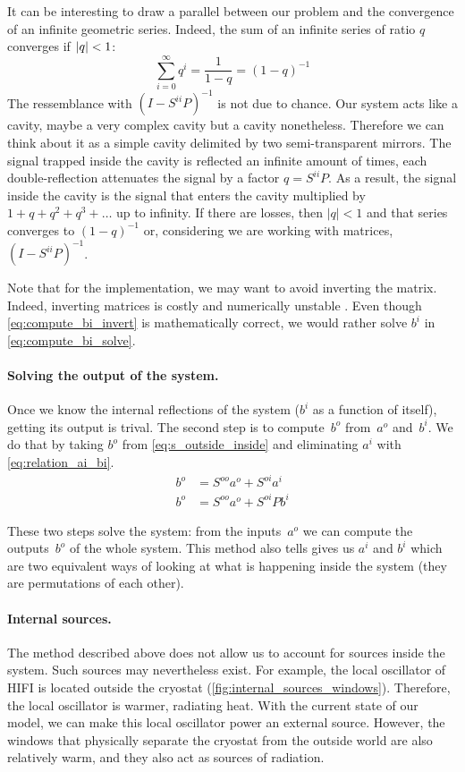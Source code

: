 It can be interesting to draw a parallel between our problem and the convergence of an infinite geometric series.
Indeed, the sum of an infinite series of ratio $q$ converges if $\left| q \right| < 1$:
\begin{equation}
    \sum_{i=0}^\infty q^i = \frac{1}{1-q} = (1-q)^{-1}
\end{equation}
The ressemblance with $(I - S^{ii}P)^{-1}$ is not due to chance.
Our system acts like a cavity, maybe a very complex cavity but a cavity nonetheless.
Therefore we can think about it as a simple cavity delimited by two semi-transparent mirrors.
The signal trapped inside the cavity is reflected an infinite amount of times, each double-reflection attenuates the signal by a factor $q=S^{ii}P$.
As a result, the signal inside the cavity is the signal that enters the cavity multiplied by $1+q+q^2+q^3+\dots$ up to infinity.
If there are losses, then $|q|<1$ and that series converges to $(1-q)^{-1}$ or, considering we are working with matrices, $(I - S^{ii}P)^{-1}$.

Note that for the implementation, we may want to avoid inverting the matrix.
Indeed, inverting matrices is costly and numerically unstable .
Even though \cref{eq:compute_bi_invert} is mathematically correct, we would rather solve $b^i$ in \cref{eq:compute_bi_solve}.

\paragraph{Solving the output of the system.}
Once we know the internal reflections of the system ($b^i$ as a function of itself), getting its output is trival.
The second step is to compute~$b^o$ from~$a^o$ and~$b^i$.
We do that by taking $b^o$ from \cref{eq:s_outside_inside} and eliminating $a^i$ with \cref{eq:relation_ai_bi}.
\begin{align}
    b^o &= S^{oo}a^o + S^{oi}a^i \\
    b^o &= S^{oo}a^o + S^{oi}Pb^i \label{eq:compute_bo}
\end{align}

These two steps solve the system: from the inputs~$a^o$ we can compute the outputs~$b^o$ of the whole system.
This method also tells gives us $a^i$ and $b^i$ which are two equivalent ways of looking at what is happening inside the system (they are permutations of each other).

\paragraph{Internal sources.}
The method described above does not allow us to account for sources inside the system.
Such sources may nevertheless exist.
For example, the local oscillator of HIFI is located outside the cryostat (\cref{fig:internal_sources_windows}).
Therefore, the local oscillator is warmer, radiating heat.
With the current state of our model, we can make this local oscillator power an external source.
However, the windows that physically separate the cryostat from the outside world are also relatively warm, and they also act as sources of radiation.

